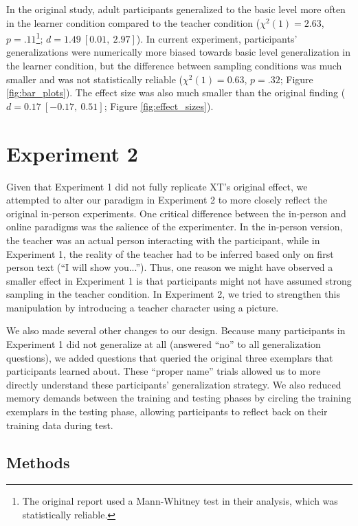 \documentclass[man]{apa2}
\begin{document}
In the original study, adult participants generalized to the basic level more often in the learner condition compared to the teacher condition ($\chi^2(1) = 2.63$, $p = .11$\footnote{The original report used a Mann-Whitney test in their analysis, which was statistically reliable.}; $d = 1.49\ [0.01,\ 2.97]$). In current experiment, participants' generalizations were numerically more biased towards basic level generalization in the learner condition, but the difference between sampling conditions was much smaller and was not statistically reliable ($\chi^2(1) = 0.63$, $p = .32$; Figure \ref{fig:bar_plots}). The effect size was also much smaller than the original finding ($d = 0.17\ [-0.17,\ 0.51]$; Figure \ref{fig:effect_sizes}).

\section{Experiment 2}

Given that Experiment 1 did not fully replicate XT's original effect, we attempted to alter our paradigm in Experiment 2 to more closely reflect the original in-person experiments. One critical difference between the in-person and online paradigms was the salience of the experimenter. In the in-person version, the teacher was an actual person interacting with the participant, while in Experiment 1, the reality of the teacher had to be inferred based only on first person text (``I will show you...''). Thus, one reason we might have observed a smaller effect in Experiment 1 is that participants might not have assumed strong sampling in the teacher condition. In Experiment 2, we tried to strengthen this manipulation by introducing a teacher character using a picture.

We also made several other changes to our design. Because many participants in Experiment 1 did not generalize at all (answered ``no'' to all generalization questions), we added questions that queried the original three exemplars that participants learned about. These ``proper name'' trials allowed us to more directly understand these participants' generalization strategy. We also reduced memory demands between the training and testing phases by circling the training exemplars in the testing phase, allowing participants to reflect back on their training data during test.

\subsection{Methods}
\end{document}
